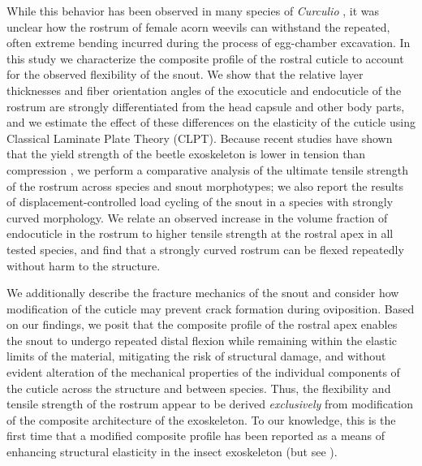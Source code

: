 \documentclass[twocolumn, linenumbers, superscriptaddress, nofootinbib]{revtex4-1}
\begin{document}
{	While this behavior has been observed in many species of \textit{Curculio} \cite{Gibson1969, Moffett1989, AguirreUribe1978, Toju2005}, it was unclear how the rostrum of female acorn weevils can withstand the repeated, often extreme bending incurred during the process of egg-chamber excavation.
	In this study we characterize the composite profile of the rostral cuticle to account for the observed flexibility of the snout.
	We show that the relative layer thicknesses and fiber orientation angles of the exocuticle and endocuticle of the rostrum are strongly differentiated from the head capsule and other body parts, and we estimate the effect of these differences on the elasticity of the cuticle using Classical Laminate Plate Theory (CLPT).
	Because recent studies have shown that the yield strength of the beetle exoskeleton is lower in tension than compression \cite{Longhai2017}, we perform a comparative analysis of the ultimate tensile strength of the rostrum across species and snout morphotypes; we also report the results of displacement-controlled load cycling of the snout in a species with strongly curved morphology.
	We relate an observed increase in the volume fraction of endocuticle in the rostrum to higher tensile strength at the rostral apex in all tested species, and find that a strongly curved rostrum can be flexed repeatedly without harm to the structure.
	
	We additionally describe the fracture mechanics of the snout and consider how modification of the cuticle may prevent crack formation during oviposition.
	Based on our findings, we posit that the composite profile of the rostral apex enables the snout to undergo repeated distal flexion while remaining within the elastic limits of the material, mitigating the risk of structural damage, and without evident alteration of the mechanical properties of the individual components of the cuticle across the structure and between species.
	Thus, the flexibility and tensile strength of the rostrum appear to be derived \emph{exclusively} from modification of the composite architecture of the exoskeleton.
	To our knowledge, this is the first time that a modified composite profile has been reported as a means of enhancing structural elasticity in the insect exoskeleton (but see \cite{Matsumura2017}).
}	
\end{document}
